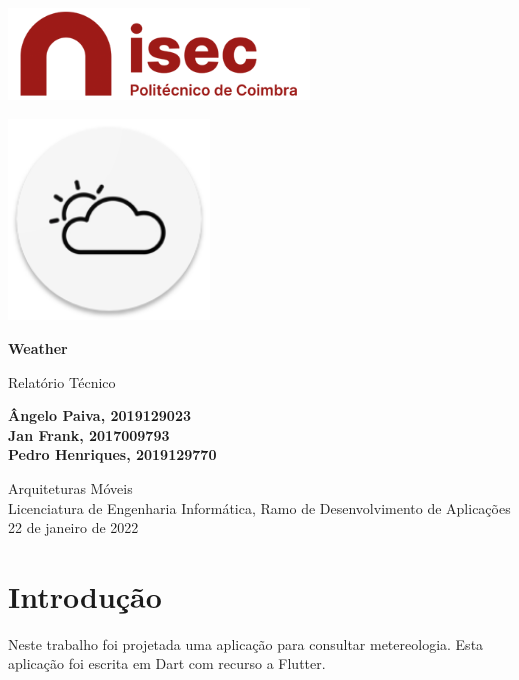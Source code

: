 \documentclass[11pt]{article}
\begin{document}
	\begin{titlepage}
		\begin{center}
			\includegraphics[width=0.6\textwidth]{logo-isec}
			
			\vspace*{\fill}
			
			\includegraphics[width=0.4\textwidth]{icon-weather}
			
			\Huge
			\textbf{Weather}
			
			\huge
			Relatório Técnico
			
			\vspace{2cm}
			
			\Large
			\textbf{
				Ângelo Paiva, 2019129023 \\
				Jan Frank, 2017009793 \\
				Pedro Henriques, 2019129770
			}
			
			\vfill
			\vspace*{\fill}
			
			\normalsize
			Arquiteturas Móveis \\
			Licenciatura de Engenharia Informática, Ramo de Desenvolvimento de Aplicações \\
			22 de janeiro de 2022		
		\end{center}
	\end{titlepage}

	\tableofcontents
	\pagebreak
	
	\large
	\section{Introdução}
	\normalsize
	
	Neste trabalho foi projetada uma aplicação para consultar metereologia. Esta aplicação foi escrita em Dart com recurso a Flutter.
	
\end{document}
